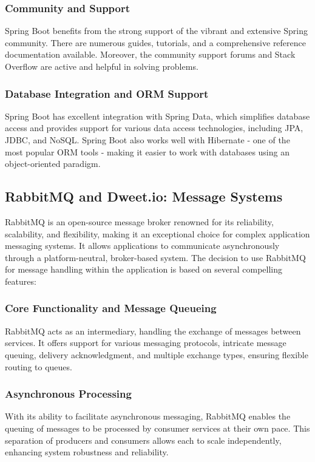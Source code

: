 \subsubsection{Community and Support} 

Spring Boot benefits from the strong support of the vibrant and extensive Spring community. 
There are numerous guides, tutorials, and a comprehensive reference documentation available. 
Moreover, the community support forums and Stack Overflow are active and helpful in solving problems.

\subsubsection{Database Integration and ORM Support} 


Spring Boot has excellent integration with Spring Data, which simplifies database access and provides support for various data access technologies, including JPA, JDBC, and NoSQL. 
Spring Boot also works well with Hibernate - one of the most popular ORM tools - making it easier to work with databases using an object-oriented paradigm.

\subsection{RabbitMQ and Dweet.io: Message Systems}

RabbitMQ is an open-source message broker renowned for its reliability, scalability, and flexibility, making it an exceptional choice for complex application messaging systems. It allows applications to communicate asynchronously through a platform-neutral, broker-based system. The decision to use RabbitMQ for message handling within the application is based on several compelling features:

\subsubsection{Core Functionality and Message Queueing}
RabbitMQ acts as an intermediary, handling the exchange of messages between services. It offers support for various messaging protocols, intricate message queuing, delivery acknowledgment, and multiple exchange types, ensuring flexible routing to queues.

\subsubsection{Asynchronous Processing}
With its ability to facilitate asynchronous messaging, RabbitMQ enables the queuing of messages to be processed by consumer services at their own pace. This separation of producers and consumers allows each to scale independently, enhancing system robustness and reliability.

